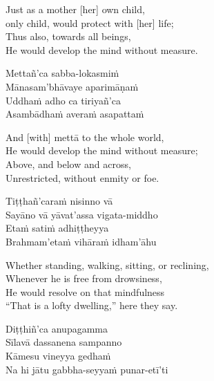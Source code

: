 \begin{english-verses}
  Just as a mother [her] own child,\\\relax
  [Her] only child, would protect with [her] life; \\
  Thus also, towards all beings,\\
  He would develop the mind without measure.
\end{english-verses}

\begin{pali-hang-continued}
  Mettañ'ca sabba-lokasmiṁ\\
  Mānasam'bhāvaye aparimāṇaṁ\\
  Uddhaṁ adho ca tiriyañ'ca\\
  Asambādhaṁ averaṁ asapattaṁ
\end{pali-hang-continued}

\begin{english-verses}
  And [with] mettā to the whole world,\\
  He would develop the mind without measure;\\
  Above, and below and across,\\
  Unrestricted, without enmity or foe.
\end{english-verses}

\begin{pali-hang-continued}
  Tiṭṭhañ'caraṁ nisinno vā\\
  Sayāno vā yāvat'assa vigata-middho\\
  Etaṁ satiṁ adhiṭṭheyya\\
  Brahmam'etaṁ vihāraṁ idham'āhu
\end{pali-hang-continued}

\begin{english-verses}
  Whether standing, walking, sitting, or reclining,\\
  Whenever he is free from drowsiness,\\
  He would resolve on that mindfulness\\
  ``That is a lofty dwelling,'' here they say.
\end{english-verses}

\begin{pali-hang-continued}
  Diṭṭhiñ'ca anupagamma\\
  Sīlavā dassanena sampanno\\
  Kāmesu vineyya gedhaṁ\\
  Na hi jātu gabbha-seyyaṁ punar-etī'ti
\end{pali-hang-continued}

